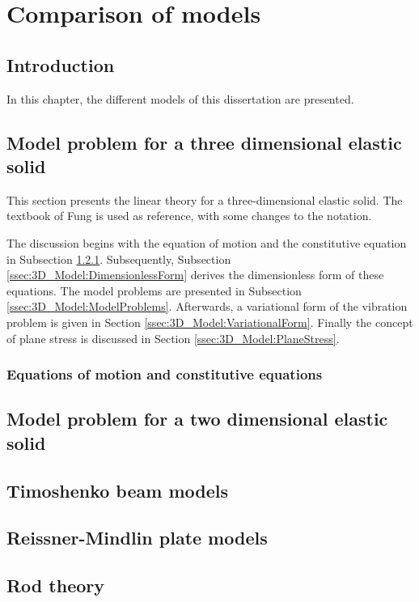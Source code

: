 \documentclass[../../main.tex]{subfiles}
\begin{document}
\chapter{Comparison of models}\label{chap:comparison_models}

\section{Introduction}\label{sec:introduction_comparison}

In this chapter, the different models of this dissertation are presented.

\section{Model problem for a three dimensional elastic solid}\label{sec:model_3D_solid}

This section presents the linear theory for a three-dimensional elastic solid.
The textbook of Fung \cite{Fung1965} is used as reference, with some changes 
to the notation.

The discussion begins with the equation of motion and the constitutive equation
in Subsection \ref{ssec:3D_Model:equations_of_motion_constitutive_equation}.
Subsequently, Subsection \ref{ssec:3D_Model:DimensionlessForm} derives the 
dimensionless form of these equations. The model problems are presented in 
Subsection \ref{ssec:3D_Model:ModelProblems}. Afterwards, a variational form of 
the vibration problem is given in Section \ref{ssec:3D_Model:VariationalForm}.
Finally the concept of plane stress is discussed in Section 
\ref{ssec:3D_Model:PlaneStress}.

\subsection{Equations of motion and constitutive equations} \label{ssec:3D_Model:equations_of_motion_constitutive_equation}

\section{Model problem for a two dimensional elastic solid}\label{sec:model_2D_solid}
\section{Timoshenko beam models}\label{sec:timoshenko_beam}
\section{Reissner-Mindlin plate models}\label{sec:reissner_mindlin_plate}
\section{Rod theory}\label{sec:rod_theory}
\end{document}
